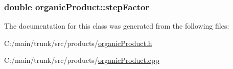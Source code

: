 \label{classorganic_product_a28373067ddc34d2b19c3891943d9695d}
\hypertarget{classorganic_product_a72c71b42022333fe698ba1b4114f12e0}{
\subsubsection[{stepFactor}]{\setlength{\rightskip}{0pt plus 5cm}double {\bf organicProduct::stepFactor}}}
\label{classorganic_product_a72c71b42022333fe698ba1b4114f12e0}


The documentation for this class was generated from the following files:\begin{DoxyCompactItemize}
\item 
C:/main/trunk/src/products/\hyperlink{organic_product_8h}{organicProduct.h}\item 
C:/main/trunk/src/products/\hyperlink{organic_product_8cpp}{organicProduct.cpp}\end{DoxyCompactItemize}
